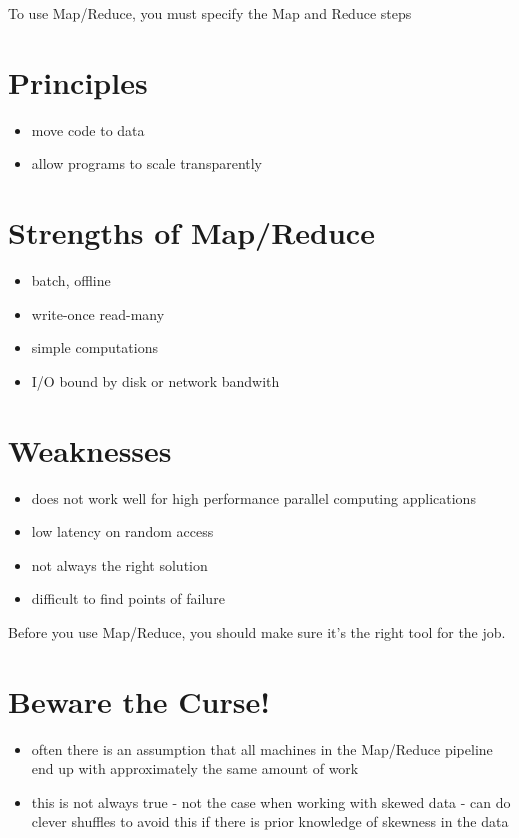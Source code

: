 To use Map/Reduce, you must specify the Map and Reduce steps

\section{Principles}
\begin{itemize}
	\item move code to data
	\item allow programs to scale transparently 
\end{itemize}

\section{Strengths of Map/Reduce}
\begin{itemize}
	\item batch, offline
	\item write-once read-many
	\item simple computations
	\item I/O bound by disk or network bandwith
\end{itemize}

\section{Weaknesses}
\begin{itemize}
	\item does not work well for high performance parallel computing applications
	\item low latency on random access
	\item not always the right solution
	\item difficult to find points of failure
\end{itemize} 

Before you use Map/Reduce, you should make sure it's the right tool for the job. 

\section{Beware the Curse!}
\begin{itemize}
	\item often there is an assumption that all machines in the Map/Reduce pipeline end up with approximately the same amount of work
	\item this is not always true
		\subitem - not the case when working with skewed data
		\subitem - can do clever shuffles to avoid this if there is prior knowledge of skewness in the data
\end{itemize}

